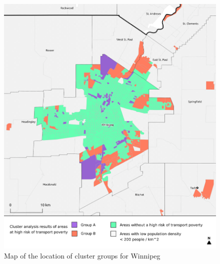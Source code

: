 \documentclass[11 pt, letterpaper]{article}
\begin{document}
{\begin{figure}[H]
	\caption{Map of the location of cluster groups for Winnipeg} 
	\label{C_wpg}
	\centerline{\includegraphics[width=6.5in]{figures/cluster_maps/C_wpg}}
	\vspace{2mm}
\end{figure}

}
\end{document}
